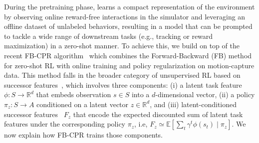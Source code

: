 

During the pretraining phase, \method{} learns a compact representation of the environment by observing online reward-free interactions in the simulator and leveraging an offline dataset of unlabeled behaviors, resulting in a model that can be prompted to tackle a wide range of downstream tasks (e.g., tracking or reward maximization) in a zero-shot manner. To achieve this, we build on top of the recent FB-CPR algorithm~\citep{TirinzoniTFGKXL25zeroshot} which combines the Forward-Backward (FB) method for zero-shot RL \citep{Touati21fb} with online training and policy regularization on motion-capture data. This method falls in the broader category of unsupervised RL based on successor features~\citep[e.g.,][]{Touati21fb,touatizerorl,Pirotta24fastimitation,park2024foundation,agarwal2024proto}, which involves three components: (i) a latent task feature $\phi: S \rightarrow \mathbb{R}^d$ that embeds observation $s \in S$ into a $d$-dimensional vector, (ii) a policy $\pi_z: S\rightarrow A$  conditioned on a latent vector $z \in \mathbb{R}^d$, and (iii) latent-conditioned successor features~\citep{barreto2017successor} $F_z$ that encode the expected discounted sum of latent task features under the corresponding policy $\pi_z$, i.e, $F_z \simeq \mathbb{E}[\sum_{t} \gamma^t \phi(s_t)\mid \pi_z ]$. We now explain how FB-CPR trains those components.


